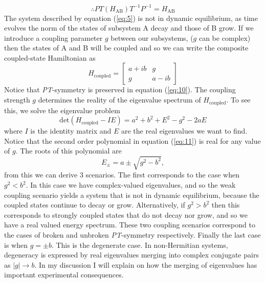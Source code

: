 \documentclass[10pt, a4paper, singlespacing]{report}
\newcommand\PT{\emph{PT}}
\begin{document}
\begin{equation} \label{eq:9}
\therefore PT(H_{\mathrm{AB}})T^{-1}P^{-1} = H_{\mathrm{AB}}
\end{equation}
The system described by equation (\ref{eq:5}) is not in dynamic equilibrium, as time evolves the norm of the states of subsystem A decay and those of B grow. If we introduce a coupling parameter $g$ between our subsystems, ($g$ can be complex) then the states of A and B will be coupled and so we can write the composite coupled-state Hamiltonian as 
\begin{equation} \label{eq:10}
H_{\mathrm{coupled}} = 
\begin{bmatrix}
a+ib & g \\ 
g & a-ib
\end{bmatrix}
\end{equation}
Notice that \PT-symmetry is preserved in equation (\ref{eq:10}). The coupling strength $g$ determines the reality of the eigenvalue spectrum of $H_{\mathrm{coupled}}$.
To see this, we solve the eigenvalue problem
\begin{equation} \label{eq:11}
\mathrm{det}(H_{\mathrm{coupled}}-IE) = a^2 +b^2 + E^2 -g^2 -2aE
\end{equation} \label{eq:11}
where $I$ is the identity matrix and $E$ are the real eigenvalues we want to find. Notice that the second order polynomial in equation (\ref{eq:11}) is real for any value of $g$. The roots of this polynomial are 
\begin{equation} \label{eq:12}
E_{\pm} = a \pm \sqrt{g^2 - b^2},
\end{equation}
from this we can derive 3 scenarios. The first corresponds to the case when $g^2 < b^2$. In this case we have complex-valued eigenvalues, and so the weak coupling scenario yields a system that is not in dynamic equilibrium, because the coupled states continue to decay or grow. Alternatively, if $g^2 > b^2$ then this corresponds to strongly coupled states that do not decay nor grow, and so we have a real valued energy spectrum. These two coupling scenarios correspond to the cases of broken and unbroken \PT-symmetry respectively. Finally the last case is when $g = \pm b$. This is the degenerate case. In non-Hermitian systems, degeneracy is expressed by real eigenvalues merging into complex conjugate pairs as $|g| \rightarrow b$. In my discussion I will explain on how the merging of eigenvalues has important experimental consequences.
\end{document}
